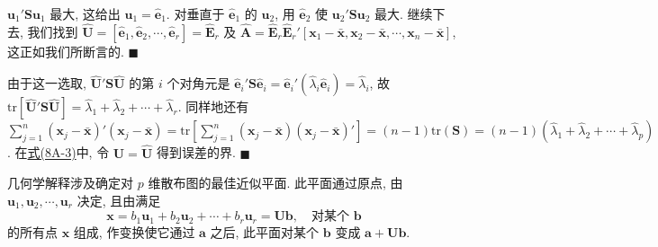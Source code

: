 
$\mathbf{u}_1'\mathbf{S}\mathbf{u}_1$ 最大, 这给出 $\mathbf{u}_1=\hat{\mathbf{e}}_1$. 对垂直于 $\hat{\mathbf{e}}_1$ 的 $\mathbf{u}_2$, 用 $\hat{\mathbf{e}}_2$ 使 $\mathbf{u}_2'\mathbf{S}\mathbf{u}_2$ 最大. 继续下去, 我们找到 $\hat{\mathbf{U}}=[\hat{\mathbf{e}}_1,\hat{\mathbf{e}}_2,\cdots,\hat{\mathbf{e}}_r]=\hat{\mathbf{E}}_r$ 及 $\hat{\mathbf{A}}=\hat{\mathbf{E}}_r\hat{\mathbf{E}}_r'[\mathbf{x}_1-\bar{\mathbf{x}},\mathbf{x}_2-\bar{\mathbf{x}},\cdots,\mathbf{x}_n-\bar{\mathbf{x}}]$, 这正如我们所断言的. \hfill$\blacksquare$

由于这一选取, $\hat{\mathbf{U}}'\mathbf{S}\hat{\mathbf{U}}$ 的第 $i$ 个对角元是 $\hat{\mathbf{e}}_i'\mathbf{S}\hat{\mathbf{e}}_i=\hat{\mathbf{e}}_i'(\hat{\lambda}_i\hat{\mathbf{e}}_i)=\hat{\lambda}_i$, 故 $\mathrm{tr}[\hat{\mathbf{U}}'\mathbf{S}\hat{\mathbf{U}}]=\hat{\lambda}_1+\hat{\lambda}_2+\cdots+\hat{\lambda}_r$. 同样地还有 $\sum_{j=1}^{n}(\mathbf{x}_j-\bar{\mathbf{x}})'(\mathbf{x}_j-\bar{\mathbf{x}})=\mathrm{tr}\left[\sum_{j=1}^{n}(\mathbf{x}_j-\bar{\mathbf{x}})(\mathbf{x}_j-\bar{\mathbf{x}})'\right]=(n-1)\mathrm{tr}(\mathbf{S})=(n-1)(\hat{\lambda}_1+\hat{\lambda}_2+\cdots+\hat{\lambda}_p)$. 在\hyperref[eq:8A-3]{式(8A-3)}中, 令 $\mathbf{U}=\hat{\mathbf{U}}$ 得到误差的界. \hfill$\blacksquare$


几何学解释涉及确定对 $p$ 维散布图的最佳近似平面. 此平面通过原点, 由 $\mathbf{u}_1,\mathbf{u}_2,\cdots,\mathbf{u}_r$ 决定, 且由满足
\[
\mathbf{x}=b_1\mathbf{u}_1+b_2\mathbf{u}_2+\cdots+b_r\mathbf{u}_r=\mathbf{U}\mathbf{b},\quad \text{对某个 } \mathbf{b}
\]
的所有点 $\mathbf{x}$ 组成, 作变换使它通过 $\mathbf{a}$ 之后, 此平面对某个 $\mathbf{b}$ 变成 $\mathbf{a}+\mathbf{U}\mathbf{b}$.

